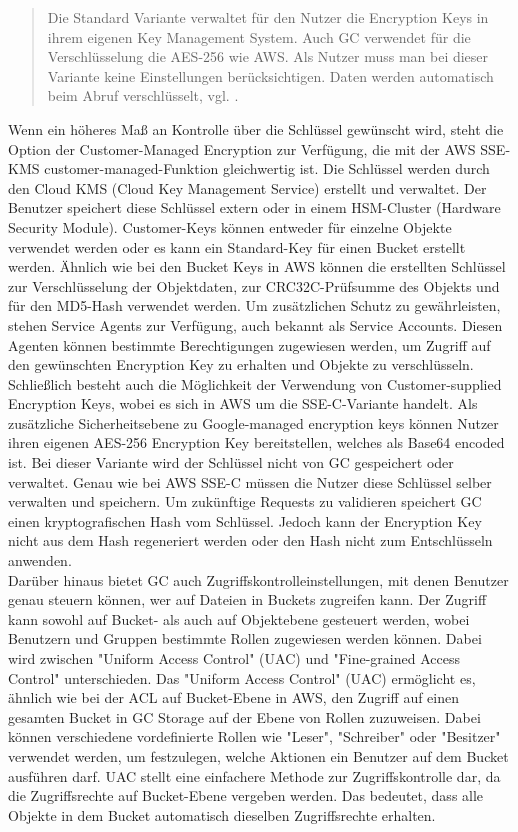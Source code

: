 \begin{quote}
	Die Standard Variante verwaltet für den Nutzer die Encryption Keys in ihrem eigenen Key Management System. Auch GC verwendet für die Verschlüsselung die AES-256 wie AWS. Als Nutzer muss man bei dieser Variante keine Einstellungen berücksichtigen. Daten werden automatisch beim Abruf verschlüsselt, vgl. \cite{gcp-encrypt}.
\end{quote}

Wenn ein höheres Maß an Kontrolle über die Schlüssel gewünscht wird, steht die Option der Customer-Managed Encryption zur Verfügung, die mit der AWS SSE-KMS customer-managed-Funktion gleichwertig ist. Die Schlüssel werden durch den Cloud KMS (Cloud Key Management Service) erstellt und verwaltet. Der Benutzer speichert diese Schlüssel extern oder in einem HSM-Cluster (Hardware Security Module). Customer-Keys können entweder für einzelne Objekte verwendet werden oder es kann ein Standard-Key für einen Bucket erstellt werden. Ähnlich wie bei den Bucket Keys in AWS können die erstellten Schlüssel zur Verschlüsselung der Objektdaten, zur CRC32C-Prüfsumme des Objekts und für den MD5-Hash verwendet werden. Um zusätzlichen Schutz zu gewährleisten, stehen Service Agents zur Verfügung, auch bekannt als Service Accounts. Diesen Agenten können bestimmte Berechtigungen zugewiesen werden, um Zugriff auf den gewünschten Encryption Key zu erhalten und Objekte zu verschlüsseln.\\


Schließlich besteht auch die Möglichkeit der Verwendung von Customer-supplied Encryption Keys, wobei es sich in AWS um die SSE-C-Variante handelt. Als zusätzliche Sicherheitsebene zu Google-managed encryption keys können Nutzer ihren eigenen AES-256 Encryption Key bereitstellen, welches als Base64 encoded ist. Bei dieser Variante wird der Schlüssel nicht von GC gespeichert oder verwaltet. Genau wie bei AWS SSE-C müssen die Nutzer diese Schlüssel selber verwalten und speichern. Um zukünftige Requests zu validieren speichert GC einen kryptografischen Hash vom Schlüssel. Jedoch kann der Encryption Key nicht aus dem Hash regeneriert werden oder den Hash nicht zum Entschlüsseln anwenden.\\

Darüber hinaus bietet GC auch Zugriffskontrolleinstellungen, mit denen Benutzer genau steuern können, wer auf Dateien in Buckets zugreifen kann. Der Zugriff kann sowohl auf Bucket- als auch auf Objektebene gesteuert werden, wobei Benutzern und Gruppen bestimmte Rollen zugewiesen werden können. Dabei wird zwischen "Uniform Access Control" (UAC) und "Fine-grained Access Control" unterschieden. Das "Uniform Access Control" (UAC) ermöglicht es, ähnlich wie bei der ACL auf Bucket-Ebene in AWS, den Zugriff auf einen gesamten Bucket in GC Storage auf der Ebene von Rollen zuzuweisen. Dabei können verschiedene vordefinierte Rollen wie "Leser", "Schreiber" oder "Besitzer" verwendet werden, um festzulegen, welche Aktionen ein Benutzer auf dem Bucket ausführen darf. UAC stellt eine einfachere Methode zur Zugriffskontrolle dar, da die Zugriffsrechte auf Bucket-Ebene vergeben werden. Das bedeutet, dass alle Objekte in dem Bucket automatisch dieselben Zugriffsrechte erhalten.\\

